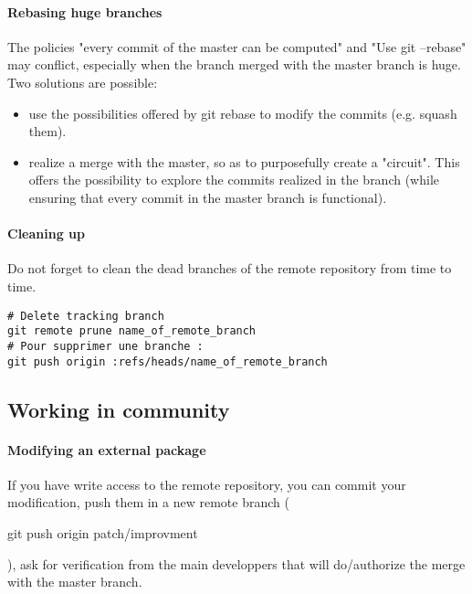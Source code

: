 \paragraph{Rebasing huge branches}
The policies "every commit of the master can be computed" and "Use git --rebase" may conflict, especially 
when the branch merged with the master branch is huge.
Two solutions are possible:
\begin{itemize}
\item use the possibilities offered by git rebase to modify the commits (e.g. squash them).
\item realize a merge with the master, so as to purposefully create a "circuit". 
This offers the possibility to explore the commits realized in the branch (while ensuring that every commit in the master branch is functional).
\end{itemize}

\paragraph{Cleaning up}

Do not forget to clean the dead branches of the remote repository from time to time.
\begin{verbatim}
# Delete tracking branch
git remote prune name_of_remote_branch
# Pour supprimer une branche :
git push origin :refs/heads/name_of_remote_branch
\end{verbatim}


\subsection{Working in community}

\paragraph{Modifying an external package}
If you have write access to the remote repository, you can commit your modification, push them in a new remote branch (\begin{tt}git push origin patch/improvment\end{tt}), ask for verification from the main developpers that will do/authorize the merge with the master branch. \\


